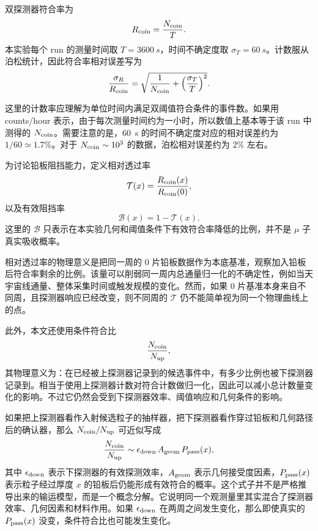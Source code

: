 \documentclass[aps,prl,twocolumn,superscriptaddress,nofootinbib]{revtex4-2}
\begin{document}
双探测器符合率为
\begin{equation}
R_{\rm coin}=\frac{N_{\rm coin}}{T}.
\end{equation}
本实验每个 run 的测量时间取 $T=\SI{3600}{s}$，时间不确定度取 $\sigma_T=\SI{60}{s}$。计数服从泊松统计，因此符合率相对误差写为
\begin{equation}
\frac{\sigma_R}{R_{\rm coin}}
=\sqrt{\frac{1}{N_{\rm coin}}+\left(\frac{\sigma_T}{T}\right)^2}.
\end{equation}

这里的计数率应理解为单位时间内满足双阈值符合条件的事件数。如果用 counts/hour 表示，由于每次测量时间约为一小时，所以数值上基本等于该 run 中测得的 $N_{\rm coin}$。需要注意的是，\SI{60}{s} 的时间不确定度对应的相对误差约为 $1/60\simeq1.7\%$。对于 $N_{\rm coin}\sim10^3$ 的数据，泊松相对误差约为 $2\%$ 左右。

为讨论铅板阻挡能力，定义相对透过率
\begin{equation}
\mathcal{T}(x)=\frac{R_{\rm coin}(x)}{R_{\rm coin}(0)},
\end{equation}
以及有效阻挡率
\begin{equation}
\mathcal{B}(x)=1-\mathcal{T}(x).
\end{equation}
这里的 $\mathcal{B}$ 只表示在本实验几何和阈值条件下有效符合率降低的比例，并不是 $\mu$ 子真实吸收概率。

相对透过率的物理意义是把同一周的 0 片铅板数据作为本底基准，观察加入铅板后符合率剩余的比例。该量可以削弱同一周内总通量归一化的不确定性，例如当天宇宙线通量、整体采集时间或触发规模的变化。然而，如果 0 片基准本身来自不同周，且探测器响应已经改变，则不同周的 $\mathcal{T}$ 仍不能简单视为同一个物理曲线上的点。

此外，本文还使用条件符合比
\begin{equation}
\frac{N_{\rm coin}}{N_{\rm up}},
\end{equation}
其物理意义为：在已经被上探测器记录到的候选事件中，有多少比例也被下探测器记录到。相当于使用上探测器计数对符合计数做归一化，因此可以减小总计数量变化的影响。不过它仍然会受到下探测器效率、阈值响应和几何条件的影响。

如果把上探测器看作入射候选粒子的抽样器，把下探测器看作穿过铅板和几何路径后的确认器，那么 $N_{\rm coin}/N_{\rm up}$ 可近似写成
\begin{equation}
\frac{N_{\rm coin}}{N_{\rm up}}
\sim \epsilon_{\rm down}\, A_{\rm geom}\, P_{\rm pass}(x),
\end{equation}
其中 $\epsilon_{\rm down}$ 表示下探测器的有效探测效率，$A_{\rm geom}$ 表示几何接受度因素，$P_{\rm pass}(x)$ 表示粒子经过厚度 $x$ 的铅板后仍能形成有效符合的概率。这个式子并不是严格推导出来的输运模型，而是一个概念分解。它说明同一个观测量里其实混合了探测器效率、几何因素和材料作用。如果 $\epsilon_{\rm down}$ 在两周之间发生变化，那么即使真实的 $P_{\rm pass}(x)$ 没变，条件符合比也可能发生变化。
\end{document}
